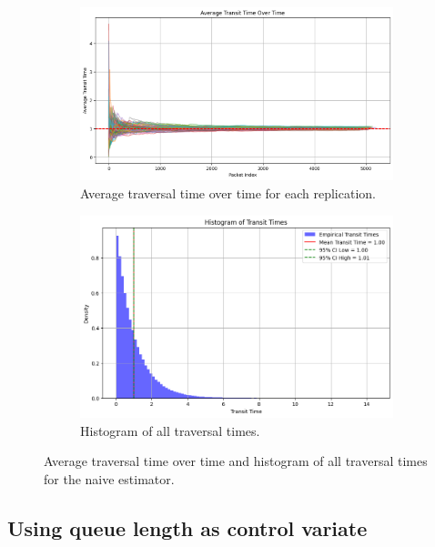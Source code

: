 \documentclass[a4paper]{article}
\begin{document}
\begin{figure}[htbp]
  \centering
  \begin{subfigure}[t]{0.4\textwidth}
    \centering
    \includegraphics[width=\textwidth]{images/ex2_p1_avg_tt.png}
    \caption{
      Average traversal time over time for each replication.
    }\label{fig:e2p1-avg-tt}
  \end{subfigure}
  \hfill
  \begin{subfigure}[t]{0.4\textwidth}
    \centering
    \includegraphics[width=\textwidth]{images/ex2_p1_tt.png}
    \caption{
      Histogram of all traversal times.
    }\label{fig:e2p1-tt}
  \end{subfigure}
  \caption{
    Average traversal time over time and histogram of all traversal times for the naive estimator.
  }\label{fig:e2p1}
\end{figure}

\subsection*{Using queue length as control variate}
\end{document}
